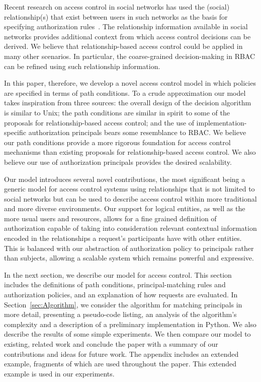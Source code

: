 \documentclass{article}
\begin{document}
Recent research on access control in social networks has used the (social) relationship(s) that exist between users in such networks as the basis for specifying authorization rules~\cite{Carminati_Enforcing,ChengPS12passat,ChengPS12dbsec,Fong_ReBAC}.
The relationship information available in social networks provides additional context from which access control decisions can be derived.
We believe that relationship-based access control could be applied in many other scenarios.
In particular, the coarse-grained decision-making in RBAC can be refined using such relationship information.

In this paper, therefore, we develop a novel access control model in which policies are specified in terms of path conditions.
To a crude approximation our model takes inspiration from three sources: the overall design of the decision algorithm is similar to Unix; the path conditions are similar in spirit to some of the proposals for relationship-based access control; and the use of implementation-specific authorization principals bears some resemblance to RBAC.
We believe our path conditions provide a more rigorous foundation for access control mechanisms than existing proposals for relationship-based access control.
We also believe our use of authorization principals provides the desired scalability.


Our model introduces several novel contributions, the most significant being a generic model for access control systems using relationships that is not limited to social networks but can be used to describe access control within more traditional and more diverse environments.
Our support for logical entities, as well as the more usual users and resources, allows for a fine grained definition of authorization capable of taking into consideration relevant contextual information encoded in the relationships a request's participants have with other entities.
This is balanced with our abstraction of authorization policy to principals rather than subjects, allowing a scalable system which remains powerful and expressive.

In the next section, we describe our model for access control.
This section includes the definitions of path conditions, principal-matching rules and authorization policies, and an explanation of how requests are evaluated.
In Section~\ref{sec:Algorithm}, we consider the algorithm for matching principals in more detail, presenting a pseudo-code listing, an analysis of the algorithm's complexity and a description of a preliminary implementation in Python.
We also describe the results of some simple experiments.
We then compare our model to existing, related work and conclude the paper with a summary of our contributions and ideas for future work.
The appendix includes an extended example, fragments of which are used throughout the paper.
This extended example is used in our experiments.
\end{document}
